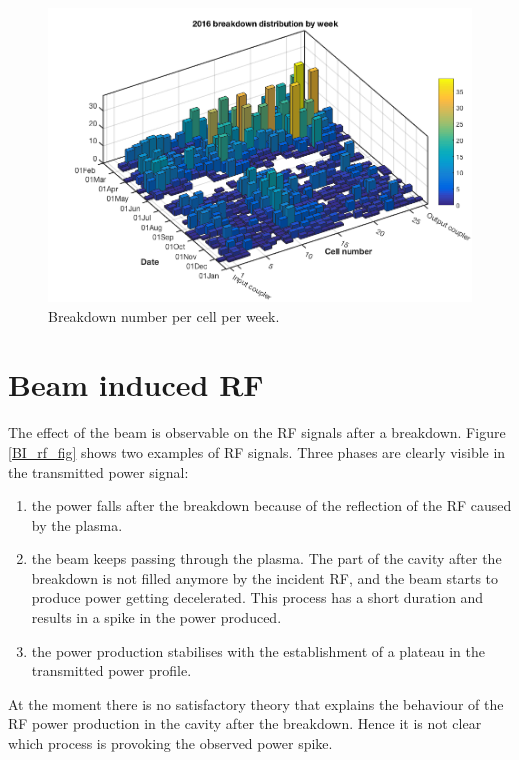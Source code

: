 \begin{figure}[h]
\centering 
\includegraphics[scale=0.4]{pictures/week_distr_3D.png}
\caption{Breakdown number per cell per week. }
\label{BD_3d}
\end{figure}








\newpage
\section[Beam induced RF]{Beam induced RF}

The effect of the beam is observable on the RF signals after a breakdown. Figure \ref{BI_rf_fig}  shows two examples of RF signals. Three phases are clearly visible in the transmitted power signal: 
\begin{enumerate}
\item the power falls after the breakdown because of the reflection of the RF caused by the plasma.
\item the beam keeps passing through the plasma. The part of the cavity after the breakdown is not filled anymore by the incident RF, and the beam starts to produce power getting decelerated. This process has a short duration and results in a spike in the power produced. 
\item the power production stabilises with the establishment of a plateau in the transmitted power profile.
\end{enumerate}
At the moment there is no satisfactory theory that explains the behaviour of the RF power production in the cavity after the breakdown. Hence it is not clear which process is provoking the observed power spike.

